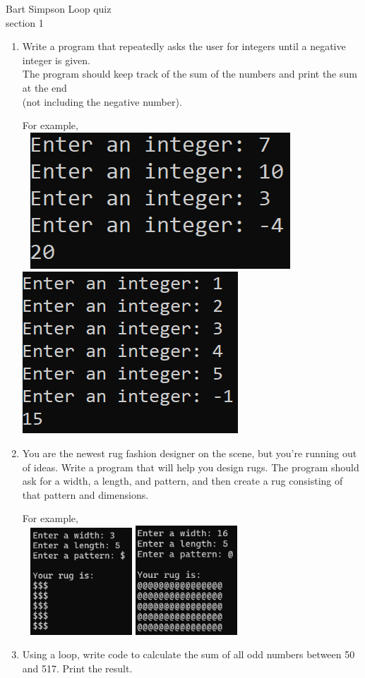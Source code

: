 \documentclass{article}
\begin{document}
\pagebreak
Bart Simpson \hfill Loop quiz\\
section 1\\
\begin{enumerate}
	\item 
		Write a program that repeatedly asks the user for integers until a negative integer is 
		given. \\ The program should keep track of the sum of the numbers and print the sum at the 
		end \\(not including the negative number).

		For example, \\ \ \hfill
		\includegraphics[width = 2.in]{./imgs/AddCalc2.PNG} \hfill  
		\includegraphics[width = 2.in]{./imgs/AddCalc1.PNG} \hfill \


	\item 
		You are the newest rug fashion designer on the scene, but you're running out of ideas. 
		Write a program that will help you design rugs.  The program should ask for a width, 
		a length, and pattern, and then create a rug consisting of that pattern and dimensions.

		For example, \\ \ \hfill
		\includegraphics[width = 1.5in]{./imgs/rug1.PNG} \hfill  
		\includegraphics[width = 1.5in]{./imgs/rug2.PNG} \hfill \


	\item 
		Using a loop, write code to calculate the sum of all odd numbers between 50 and 517. 
		Print the result.


\end{enumerate}
\end{document}
